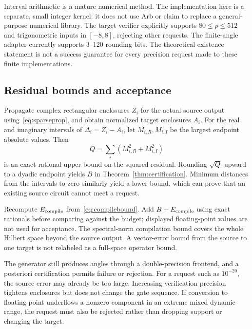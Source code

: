 Interval arithmetic is a mature numerical method\cite{johansson2016}. The implementation here is a separate, small integer kernel: it does not use Arb or claim to replace a general-purpose numerical library. The target verifier explicitly supports $80\le p\le512$ and trigonometric inputs in $[-8,8]$, rejecting other requests. The finite-angle adapter currently supports 3--120 rounding bits. The theoretical existence statement is not a success guarantee for every precision request made to these finite implementations.

\subsection{Residual bounds and acceptance}
Propagate complex rectangular enclosures $Z_i$ for the actual source output using~\eqref{eq:sparseprop}, and obtain normalized target enclosures $A_i$. For the real and imaginary intervals of $\Delta_i=Z_i-A_i$, let $M_{i,R},M_{i,I}$ be the largest endpoint absolute values. Then
\[
Q=\sum_i(M_{i,R}^2+M_{i,I}^2)
\]
is an exact rational upper bound on the squared residual. Rounding $\sqrt Q$ upward to a dyadic endpoint yields $B$ in Theorem~\ref{thm:certification}. Minimum distances from the intervals to zero similarly yield a lower bound, which can prove that an existing source circuit cannot meet a request.

Recompute $E_{\rm compile}$ from~\eqref{eq:compilebound}. Add $B+E_{\rm compile}$ using exact rationals before comparing against the budget; displayed floating-point values are not used for acceptance. The spectral-norm compilation bound covers the whole Hilbert space beyond the source output. A vector-error bound from the source to one target is not relabeled as a full-space operator bound.

The generator still produces angles through a double-precision frontend, and a posteriori certification permits failure or rejection. For a request such as $10^{-20}$, the source error may already be too large. Increasing verification precision tightens enclosures but does not change the gate sequence. If conversion to floating point underflows a nonzero component in an extreme mixed dynamic range, the request must also be rejected rather than dropping support or changing the target.
